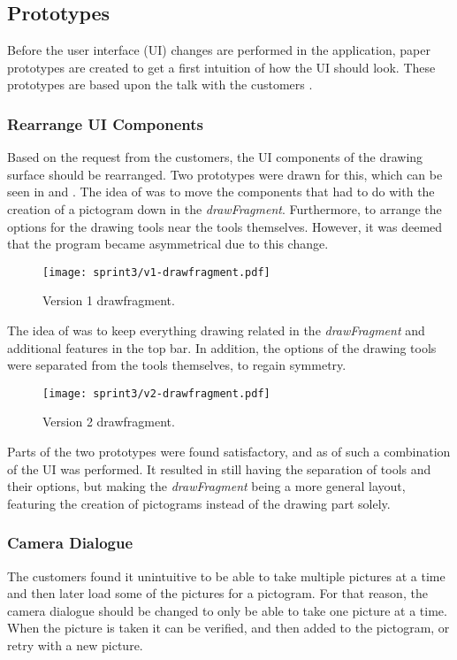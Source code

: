 \subsection{Prototypes}
Before the user interface (UI) changes are performed in the application, paper prototypes are created to get a first intuition of how the UI should look.
These prototypes are based upon the talk with the customers \citep{misc:drazenko, misc:pernille}.
 
\subsubsection*{Rearrange UI Components}
Based on the request from the customers, the UI components of the drawing surface should be rearranged.
Two prototypes were drawn for this, which can be seen in  and .
The idea of  was to move the components that had to do with the creation of a pictogram down in the \textit{drawFragment}. Furthermore, to arrange the options for the drawing tools near the tools themselves.
However, it was deemed that the program became asymmetrical due to this change.

\begin{figure}[h]
     \centering
     \texttt{[image: sprint3/v1-drawfragment.pdf]}
     \caption{Version 1 drawfragment.}
     \label{fig:v1drawfrag}
\end{figure}

The idea of  was to keep everything drawing related in the \textit{drawFragment} and additional features in the top bar. In addition, the options of the drawing tools were separated from the tools themselves, to regain symmetry.

\begin{figure}[h]
     \centering
     \texttt{[image: sprint3/v2-drawfragment.pdf]}
     \caption{Version 2 drawfragment.}
     \label{fig:v2drawfrag}
\end{figure}

Parts of the two prototypes were found satisfactory, and as of such a combination of the UI was performed.
It resulted in still having the separation of tools and their options, but making the \textit{drawFragment} being a more general layout, featuring the creation of pictograms instead of the drawing part solely.

\subsubsection*{Camera Dialogue}
The customers found it unintuitive to be able to take multiple pictures at a time and then later load some of the pictures for a pictogram.
For that reason, the camera dialogue should be changed to only be able to take one picture at a time.
When the picture is taken it can be verified, and then added to the pictogram, or retry with a new picture.

